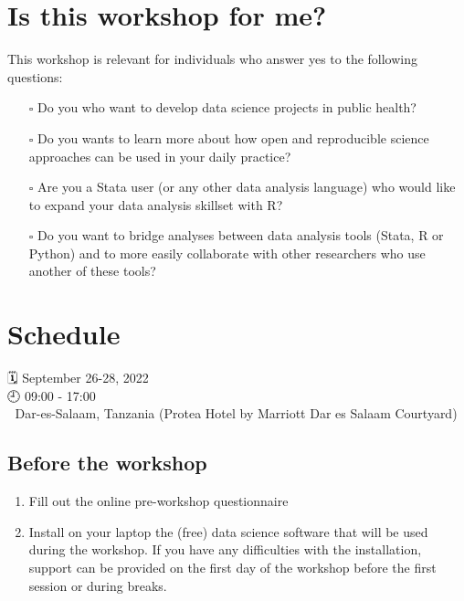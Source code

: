 \documentclass[
  letterpaper,
  DIV=11,
  numbers=noendperiod,
  oneside]{scrreprt}
\providecommand{\tightlist}{%
  \setlength{\itemsep}{0pt}\setlength{\parskip}{0pt}}\usepackage{longtable,booktabs,array}
\begin{document}
\hypertarget{is-this-workshop-for-me}{%
\section{Is this workshop for me?}\label{is-this-workshop-for-me}}

This workshop is relevant for individuals who answer yes to the
following questions:

\begin{itemize}
\tightlist
\item[$\square$]
  Do you who want to develop data science projects in public health?
\item[$\square$]
  Do you wants to learn more about how open and reproducible science
  approaches can be used in your daily practice?
\item[$\square$]
  Are you a Stata user (or any other data analysis language) who would
  like to expand your data analysis skillset with R?
\item[$\square$]
  Do you want to bridge analyses between data analysis tools (Stata, R
  or Python) and to more easily collaborate with other researchers who
  use another of these tools?
\end{itemize}

\hypertarget{schedule}{%
\section{Schedule}\label{schedule}}

{🗓️} September 26-28, 2022\\
{🕘} 09:00 - 17:00\\
{🌇} Dar-es-Salaam, Tanzania (Protea Hotel by Marriott Dar es Salaam
Courtyard)

\hypertarget{before-the-workshop}{%
\subsection{Before the workshop}\label{before-the-workshop}}

\begin{enumerate}
\def\labelenumi{\arabic{enumi}.}
\tightlist
\item
  Fill out the online pre-workshop questionnaire
\item
  Install on your laptop the (free) data science software that will be
  used during the workshop. If you have any difficulties with the
  installation, support can be provided on the first day of the workshop
  before the first session or during breaks.
\end{enumerate}
\end{document}
